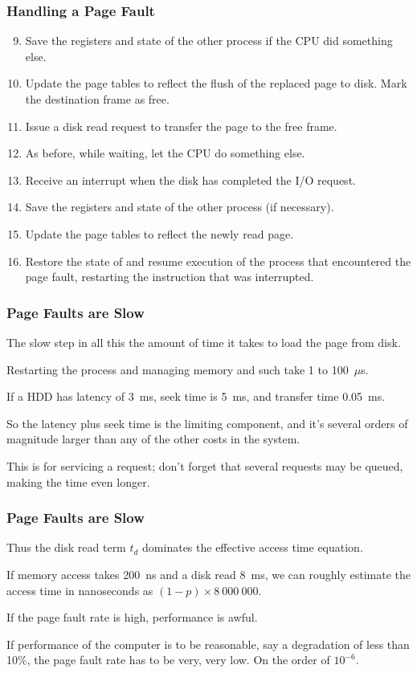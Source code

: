 \begin{frame}
\frametitle{Handling a Page Fault}

\begin{enumerate}
	\setcounter{enumi}{8}
	\item Save the registers and state of the other process if the CPU did something else.
	\item Update the page tables to reflect the flush of the replaced page to disk. Mark the destination frame as free.
	\item Issue a disk read request to transfer the page to the free frame.
	\item As before, while waiting, let the CPU do something else.
	\item Receive an interrupt when the disk has completed the I/O request.
	\item Save the registers and state of the other process (if necessary).
	\item Update the page tables to reflect the newly read page.
	\item Restore the state of and resume execution of the process that encountered the page fault, restarting the instruction that was interrupted.
\end{enumerate}


\end{frame}

\begin{frame}
\frametitle{Page Faults are Slow}

The slow step in all this the amount of time it takes to load the page from disk. 

Restarting the process and managing memory and such take 1 to 100~$\mu$s.

If a HDD has latency of 3~ms, seek time is 5~ms, and transfer time 0.05~ms. 

So the latency plus seek time is the limiting component, and it's several orders of magnitude larger than any of the other costs in the system. 

This is for servicing a request; don't forget that several requests may be queued, making the time even longer.

\end{frame}

\begin{frame}
\frametitle{Page Faults are Slow}

Thus the disk read term $t_{d}$ dominates the effective access time equation. 

If memory access takes 200~ns and a disk read 8~ms, we can roughly estimate the access time in nanoseconds as $(1-p) \times 8~000~000$. 

If the page fault rate is high, performance is awful. 

If performance of the computer is to be reasonable, say a degradation of less than 10\%, the page fault rate has to be very, very low. On the order of $10^{-6}$. 

\end{frame}


